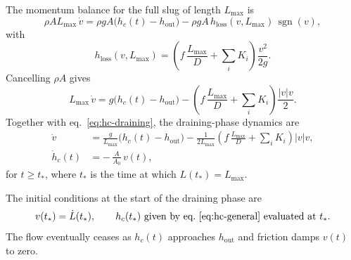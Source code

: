 \documentclass[11pt]{article}
\begin{document}
The momentum balance for the full slug of length $L_{\max}$ is
\[
\rho A L_{\max}\,\dot v
= \rho g A\bigl(h_c(t) - h_{\text{out}}\bigr)
  - \rho g A\,h_{\text{loss}}(v,L_{\max})\,\operatorname{sgn}(v),
\]
with
\[
h_{\text{loss}}(v,L_{\max})
= \left(
    f\,\frac{L_{\max}}{D}
    + \sum_i K_i
  \right)\frac{v^2}{2g}.
\]
Cancelling $\rho A$ gives
\[
L_{\max}\,\dot v
= g\bigl(h_c(t) - h_{\text{out}}\bigr)
  - \left(
      f\,\frac{L_{\max}}{D}
      + \sum_i K_i
    \right)\frac{|v|v}{2}.
\]
Together with eq.~\eqref{eq:hc-draining}, the draining-phase dynamics are
\begin{equation}
\boxed{
\begin{aligned}
\dot v
&= \frac{g}{L_{\max}}\bigl(h_c(t) - h_{\text{out}}\bigr)
   - \frac{1}{2L_{\max}}
     \left(
       f\,\frac{L_{\max}}{D}
       + \sum_i K_i
     \right)|v|v,
   \\[0.5em]
\dot h_c(t)
&= -\,\frac{A}{A_0}\,v(t),
\end{aligned}
}
\label{eq:draining-system}
\end{equation}
for $t \ge t_\ast$, where $t_\ast$ is the time at which $L(t_\ast)=L_{\max}$.

The initial conditions at the start of the draining phase are
\[
v(t_\ast) = \dot L(t_\ast), \qquad
h_c(t_\ast) \text{ given by eq.~\eqref{eq:hc-general} evaluated at } t_\ast.
\]
The flow eventually ceases as $h_c(t)$ approaches $h_{\text{out}}$ and friction
damps $v(t)$ to zero.
\end{document}
